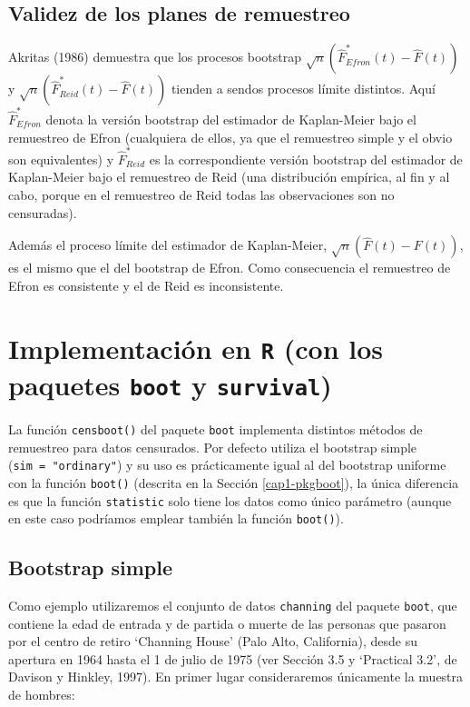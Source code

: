 \documentclass[]{book}
\theoremstyle{definition}
\theoremstyle{definition}
\theoremstyle{definition}
\theoremstyle{remark}
\begin{document}
\subsection{Validez de los planes de
remuestreo}\label{validez-de-los-planes-de-remuestreo}

Akritas (1986) demuestra que los procesos bootstrap
\(\sqrt{n}\left( \hat{F} ^{\ast}_{Efron}\left( t \right) -\hat{F}\left( t \right) \right)\)
y
\(\sqrt{n}\left( \hat{F}^{\ast}_{Reid}\left( t \right) -\hat{F}\left( t \right) \right)\)
tienden a sendos procesos límite distintos. Aquí
\(\hat{F}^{\ast}_{Efron}\) denota la versión bootstrap del estimador de
Kaplan-Meier bajo el remuestreo de Efron (cualquiera de ellos, ya que el
remuestreo simple y el obvio son equivalentes) y
\(\hat{F}^{\ast}_{Reid}\) es la correspondiente versión bootstrap del
estimador de Kaplan-Meier bajo el remuestreo de Reid (una distribución
empírica, al fin y al cabo, porque en el remuestreo de Reid todas las
observaciones son no censuradas).

Además el proceso límite del estimador de Kaplan-Meier,
\(\sqrt{n} \left( \hat{F}\left( t \right) -F\left( t \right) \right)\),
es el mismo que el del bootstrap de Efron. Como consecuencia el
remuestreo de Efron es consistente y el de Reid es inconsistente.

\section{\texorpdfstring{Implementación en \texttt{R} (con los paquetes
\texttt{boot} y
\texttt{survival})}{Implementación en R (con los paquetes boot y survival)}}\label{implementacion-en-r-con-los-paquetes-boot-y-survival}

La función \texttt{censboot()} del paquete \texttt{boot} implementa
distintos métodos de remuestreo para datos censurados. Por defecto
utiliza el bootstrap simple (\texttt{sim\ =\ "ordinary"}) y su uso es
prácticamente igual al del bootstrap uniforme con la función
\texttt{boot()} (descrita en la Sección \ref{cap1-pkgboot}), la única
diferencia es que la función \texttt{statistic} solo tiene los datos
como único parámetro (aunque en este caso podríamos emplear también la
función \texttt{boot()}).

\subsection{Bootstrap simple}\label{bootstrap-simple}

Como ejemplo utilizaremos el conjunto de datos \texttt{channing} del
paquete \texttt{boot}, que contiene la edad de entrada y de partida o
muerte de las personas que pasaron por el centro de retiro `Channing
House' (Palo Alto, California), desde su apertura en 1964 hasta el 1 de
julio de 1975 (ver Sección 3.5 y `Practical 3.2', de Davison y Hinkley,
1997). En primer lugar consideraremos únicamente la muestra de hombres:
\end{document}
